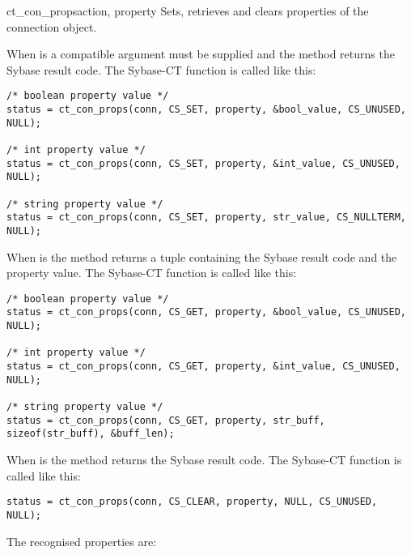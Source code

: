 \begin{methoddesc}[CS_CONNECTION]{ct_con_props}{action, property }
Sets, retrieves and clears properties of the connection object.

When  is  a compatible  argument
must be supplied and the method returns the Sybase result code.  The
Sybase-CT  function is called like this:

\begin{verbatim}
/* boolean property value */
status = ct_con_props(conn, CS_SET, property, &bool_value, CS_UNUSED, NULL);

/* int property value */
status = ct_con_props(conn, CS_SET, property, &int_value, CS_UNUSED, NULL);

/* string property value */
status = ct_con_props(conn, CS_SET, property, str_value, CS_NULLTERM, NULL);
\end{verbatim}

When  is  the method returns a tuple
containing the Sybase result code and the property value.  The
Sybase-CT  function is called like this:

\begin{verbatim}
/* boolean property value */
status = ct_con_props(conn, CS_GET, property, &bool_value, CS_UNUSED, NULL);

/* int property value */
status = ct_con_props(conn, CS_GET, property, &int_value, CS_UNUSED, NULL);

/* string property value */
status = ct_con_props(conn, CS_GET, property, str_buff, sizeof(str_buff), &buff_len);
\end{verbatim}

When  is  the method returns the Sybase
result code.  The Sybase-CT  function is
called like this:

\begin{verbatim}
status = ct_con_props(conn, CS_CLEAR, property, NULL, CS_UNUSED, NULL);
\end{verbatim}

The recognised properties are:


\end{methoddesc}
